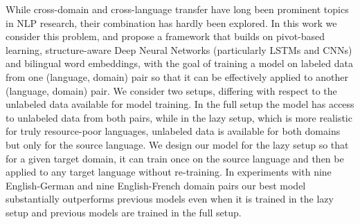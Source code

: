 While cross-domain and cross-language transfer have long been prominent topics in NLP research, their combination has hardly been explored. In this work we consider this problem, and propose a framework that builds on pivot-based learning, structure-aware Deep Neural Networks (particularly LSTMs and CNNs) and bilingual word embeddings, with the goal of training a model on labeled data from one (language, domain) pair so that it can be effectively applied to another (language, domain) pair. We consider two setups, differing with respect to the unlabeled data available for model training. In the full setup the model has access to unlabeled data from both pairs, while in the lazy setup, which is more realistic for truly resource-poor languages, unlabeled data is available for both domains but only for the source language. We design our model for the lazy setup so that for a given target domain, it can train once on the source language and then be applied to any target language without re-training. In experiments with nine English-German and nine English-French domain pairs our best model substantially outperforms previous models even when it is trained in the lazy setup and previous models are trained in the full setup.
